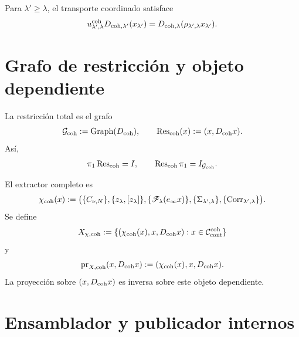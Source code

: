 Para \(\lambda'\geq\lambda\), el transporte coordinado satisface
\begin{equation}\label{eq:pdfv2-coh-d-naturality}
 u_{\lambda',\lambda}^{\rm coh}
 D_{{\rm coh},\lambda'}(x_{\lambda'})
 =D_{{\rm coh},\lambda}
  (\rho_{\lambda',\lambda}x_{\lambda'}).
\end{equation}

\section{Grafo de restricción y objeto dependiente}
\label{sec:pdfv2-coh-graphs}

La restricción total es el grafo
\begin{equation}\label{eq:pdfv2-coh-g-graph}
 \mathcal G_{\rm coh}:=\operatorname{Graph}(D_{\rm coh}),
 \qquad
 \operatorname{Res}_{\rm coh}(x):=(x,D_{\rm coh}x).
\end{equation}
Así,
\begin{equation}\label{eq:pdfv2-coh-res-inverse}
 \pi_1\operatorname{Res}_{\rm coh}=I,
 \qquad
 \operatorname{Res}_{\rm coh}\pi_1=I_{\mathcal G_{\rm coh}}.
\end{equation}

El extractor completo es
\begin{equation}\label{eq:pdfv2-coh-chi}
 \chi_{\rm coh}(x):=
 \bigl(
 \{C_{\nu,N}\},
 \{z_\lambda,[z_\lambda]\},
 \{\mathscr F_\lambda(e_\infty x)\},
 \{\Sigma_{\lambda',\lambda}\},
 \{\operatorname{Corr}_{\lambda',\lambda}\}
 \bigr).
\end{equation}
Se define
\begin{equation}\label{eq:pdfv2-coh-xchi}
 X_{\chi,{\rm coh}}
 :=\{(\chi_{\rm coh}(x),x,D_{\rm coh}x):
 x\in\mathcal C_{\rm cont}^{\rm coh}\}
\end{equation}
y
\begin{equation}\label{eq:pdfv2-coh-prx}
 \operatorname{pr}_{X,{\rm coh}}(x,D_{\rm coh}x)
 :=(\chi_{\rm coh}(x),x,D_{\rm coh}x).
\end{equation}
La proyección sobre \((x,D_{\rm coh}x)\) es inversa sobre este objeto
dependiente.

\section{Ensamblador y publicador internos}
\label{sec:pdfv2-coh-assembler-publisher}

